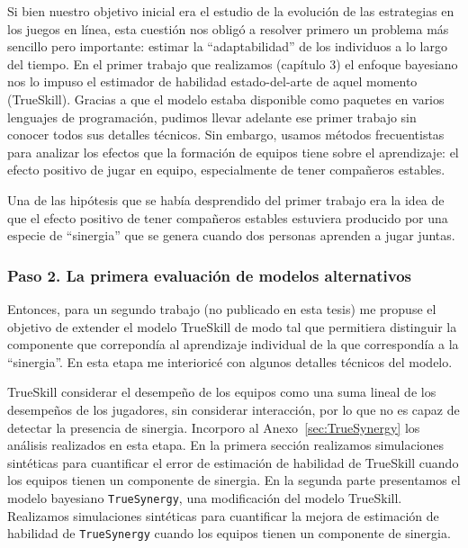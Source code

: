 \documentclass[a4paper,11pt]{book}
\theoremstyle{definition}
\begin{document}
Si bien nuestro objetivo inicial era el estudio de la evolución de las estrategias en los juegos en línea, esta cuestión nos obligó a resolver primero un problema más sencillo pero importante: estimar la ``adaptabilidad'' de los individuos a lo largo del tiempo.
%
En el primer trabajo que realizamos (capítulo 3) el enfoque bayesiano nos lo impuso el estimador de habilidad estado-del-arte de aquel momento  (TrueSkill).
%
Gracias a que el modelo estaba disponible como paquetes en varios lenguajes de programación, pudimos llevar adelante ese primer trabajo sin conocer todos sus detalles técnicos. 
%
Sin embargo, usamos métodos frecuentistas para analizar los efectos que la formación de equipos tiene sobre el aprendizaje: el efecto positivo de jugar en equipo, especialmente de tener compañeros estables.

%

Una de las hipótesis que se había desprendido del primer trabajo era la idea de que el efecto positivo de tener compañeros estables estuviera producido por una especie de ``sinergia'' que se genera cuando dos personas aprenden a jugar juntas.

\subsubsection{Paso 2. La primera evaluación de modelos alternativos}

Entonces, para un segundo trabajo (no publicado en esta tesis) me propuse el objetivo de extender el modelo TrueSkill de modo tal que permitiera distinguir la componente que correpondía al aprendizaje individual de la que correspondía a la ``sinergia''.
%
En esta etapa me interioricé con algunos detalles técnicos del modelo.


TrueSkill considerar el desempeño de los equipos como una suma lineal de los desempeños de los jugadores, sin considerar interacción, por lo que no es capaz de detectar la presencia de sinergia.
%
Incorporo al Anexo~\ref{sec:TrueSynergy} los análisis realizados en esta etapa.
%
En la primera secci\'on realizamos simulaciones sint\'eticas para cuantificar el error de estimaci\'on de habilidad de TrueSkill cuando los equipos tienen un componente de sinergia.
%
En la segunda parte presentamos el modelo bayesiano \texttt{TrueSynergy}, una modificaci\'on del modelo TrueSkill.
%
Realizamos simulaciones sint\'eticas para cuantificar la mejora de estimaci\'on de habilidad de \texttt{TrueSynergy} cuando los equipos tienen un componente de sinergia.
\end{document}
